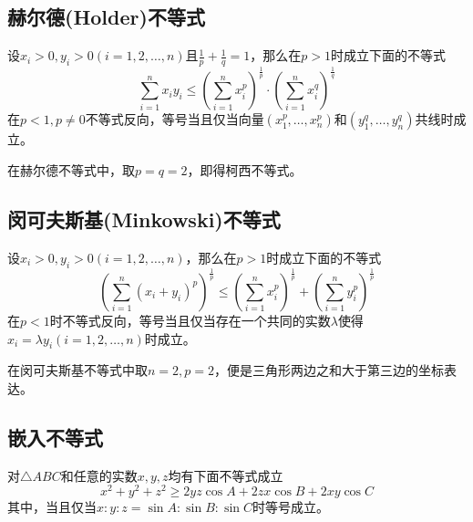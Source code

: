 \subsection{赫尔德(Holder)不等式}

\begin{theorem}[赫尔德不等式]
  设$x_i> 0, y_i> 0 (i=1,2,\ldots,n)$且$\frac{1}{p}+\frac{1}{q}=1$，那么在$p>1$时成立下面的不等式
  \begin{equation}
    \label{eq:holder-inequation}
    \sum_{i=1}^nx_iy_i \leqslant \left( \sum_{i=1}^nx_i^p \right)^{\frac{1}{p}} \cdot \left( \sum_{i=1}^nx_i^q \right)^{\frac{1}{q}}
  \end{equation}
  在$p<1,p\neq 0$不等式反向，等号当且仅当向量$(x_1^p,\ldots,x_n^p)$和$(y_1^q,\ldots,y_n^q)$共线时成立。
\end{theorem}
在赫尔德不等式中，取$p=q=2$，即得柯西不等式。

\subsection{闵可夫斯基(Minkowski)不等式}


\begin{theorem}[闵可夫斯基不等式]
  设$x_i>0, y_i>0 (i=1,2,\ldots,n)$，那么在$p>1$时成立下面的不等式
  \begin{equation}
    \label{eq:holder-inequation}
    \left( \sum_{i=1}^n(x_i+y_i)^p \right)^{\frac{1}{p}} \leqslant \left( \sum_{i=1}^nx_i^p \right)^{\frac{1}{p}} + \left( \sum_{i=1}^ny_i^p \right)^{\frac{1}{p}}
  \end{equation}
  在$p<1$时不等式反向，等号当且仅当存在一个共同的实数$\lambda$使得$x_i=\lambda y_i(i=1,2,\ldots,n)$时成立。
\end{theorem}
在闵可夫斯基不等式中取$n=2,p=2$，便是三角形两边之和大于第三边的坐标表达。

\subsection{嵌入不等式}

\begin{theorem}[嵌入不等式]
  对$\triangle ABC$和任意的实数$x,y,z$均有下面不等式成立
  \begin{equation}
    \label{eq:embedding-inequation}
    x^2+y^2+z^2 \geqslant 2yz\cos{A}+2zx\cos{B}+2xy\cos{C}
  \end{equation}
  其中，当且仅当$x:y:z = \sin{A} : \sin{B} : \sin{C}$时等号成立。
\end{theorem}

